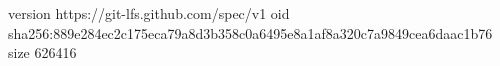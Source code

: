 version https://git-lfs.github.com/spec/v1
oid sha256:889e284ec2c175eca79a8d3b358c0a6495e8a1af8a320c7a9849cea6daac1b76
size 626416
